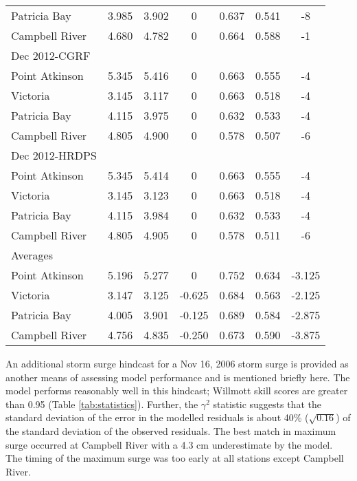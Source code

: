 \documentclass[letterpaper]{tATO2e}
\begin{document}
\begin{table}[h]
{\begin{tabular}{|l |c c c | c c c|}
Patricia Bay    & 3.985 & 3.902 & 0 & 0.637 & 0.541 & -8\\
Campbell River  & 4.680 & 4.782 & 0 & 0.664 & 0.588 & -1\\
\hline
Dec 2012-CGRF &  &  &  &  &  & \\
Point Atkinson  & 5.345 & 5.416 & 0 & 0.663 & 0.555 & -4\\
Victoria        & 3.145 & 3.117 & 0 & 0.663 & 0.518 & -4\\
Patricia Bay    & 4.115 & 3.975 & 0 & 0.632 & 0.533 & -4\\
Campbell River  & 4.805 & 4.900 & 0 & 0.578 & 0.507 & -6\\
\hline
Dec 2012-HRDPS &  &  &  &  &  & \\
Point Atkinson  & 5.345 & 5.414 & 0 & 0.663 & 0.555 & -4\\
Victoria        & 3.145 & 3.123 & 0 & 0.663 & 0.518 & -4\\
Patricia Bay    & 4.115 & 3.984 & 0 & 0.632 & 0.533 & -4\\
Campbell River  & 4.805 & 4.905 & 0 & 0.578 & 0.511 & -6\\
\hline
\hline
Averages  &  &  &  &  &  & \\
Point Atkinson  & 5.196 & 5.277 & 0  & 0.752 & 0.634 & -3.125\\
Victoria        & 3.147 & 3.125 & -0.625 & 0.684 & 0.563 & -2.125\\
Patricia Bay    & 4.005 & 3.901 & -0.125 & 0.689 & 0.584 & -2.875\\
Campbell River  & 4.756 & 4.835 & -0.250 & 0.673 & 0.590 & -3.875\\ 
\hline 
\end{tabular}}
\label{tab:peak}
\end{table}

An additional storm surge hindcast for a Nov 16, 2006 storm surge is provided as another means of assessing model performance and is mentioned briefly here. The model performs reasonably well in this hindcast; Willmott skill scores are greater than {\color{red}0.95} (Table \ref{tab:statistics}).  Further, the $\gamma^2$ statistic suggests that the standard deviation of the error in the modelled residuals is about 40\% ($\sqrt{0.16}$) of the standard deviation of the observed residuals. The best match in maximum surge occurred at Campbell River with a {\color{red}4.3 cm} underestimate by the model. {\color{red} The timing of the maximum surge was too early at all stations except Campbell River.} 
\end{document}
